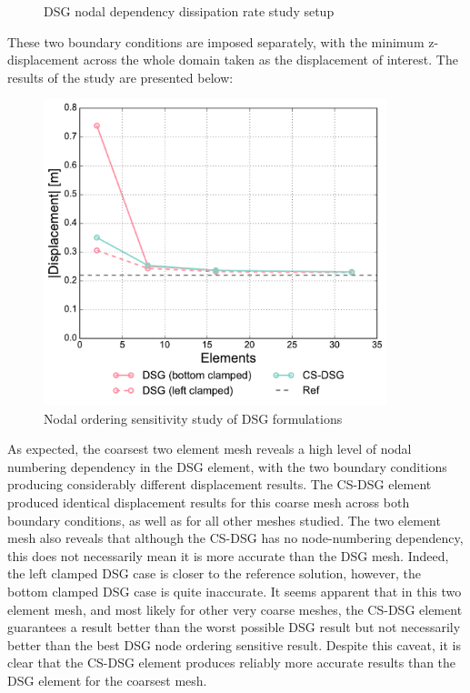 \begin{figure}[H]
	\caption{\label{csdsg_nodal_dissipation}DSG nodal dependency dissipation rate study setup}
\end{figure}

These two boundary conditions are imposed separately, with the minimum z-displacement across the whole domain taken as the displacement of interest. The results of the study are presented below:

\begin{figure}[H]
	\centering
	\includegraphics[width=10cm]{images/node_ordering_study.pdf}
	\caption{Nodal ordering sensitivity study of DSG formulations}
	\label{fig:Nodal ordering sensitivity study}
\end{figure}

As expected, the coarsest two element mesh reveals a high level of nodal numbering dependency in the DSG element, with the two boundary conditions producing considerably different displacement results. The CS-DSG element produced identical displacement results for this coarse mesh across both boundary conditions, as well as for all other meshes studied. The two element mesh also reveals that although the CS-DSG has no node-numbering dependency, this does not necessarily mean it is more accurate than the DSG mesh. Indeed, the left clamped DSG case is closer to the reference solution, however, the bottom clamped DSG case is quite inaccurate. It seems apparent that in this two element mesh, and most likely for other very coarse meshes, the CS-DSG element guarantees a result better than the worst possible DSG result but not necessarily better than the best DSG node ordering sensitive result. Despite this caveat, it is clear that the CS-DSG element produces reliably more accurate results than the DSG element for the coarsest mesh.

